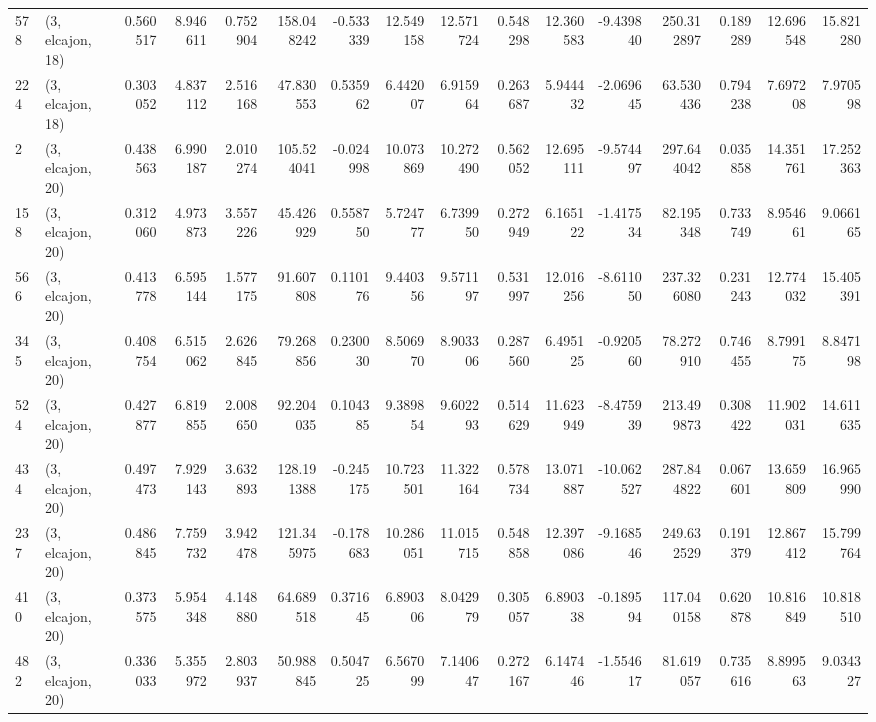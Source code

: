\begin{tabular}{llrrrrrrrrrrrrrr}
578 &  (3, elcajon, 18) &   0.560517 &   8.946611 &   0.752904 &   158.048242 &  -0.533339 &  12.549158 &  12.571724 &  0.548298 &  12.360583 &  -9.439840 &   250.312897 &  0.189289 &  12.696548 &  15.821280 \\
224 &  (3, elcajon, 18) &   0.303052 &   4.837112 &   2.516168 &    47.830553 &   0.535962 &   6.442007 &   6.915964 &  0.263687 &   5.944432 &  -2.069645 &    63.530436 &  0.794238 &   7.697208 &   7.970598 \\
2   &  (3, elcajon, 20) &   0.438563 &   6.990187 &   2.010274 &   105.524041 &  -0.024998 &  10.073869 &  10.272490 &  0.562052 &  12.695111 &  -9.574497 &   297.644042 &  0.035858 &  14.351761 &  17.252363 \\
158 &  (3, elcajon, 20) &   0.312060 &   4.973873 &   3.557226 &    45.426929 &   0.558750 &   5.724777 &   6.739950 &  0.272949 &   6.165122 &  -1.417534 &    82.195348 &  0.733749 &   8.954661 &   9.066165 \\
566 &  (3, elcajon, 20) &   0.413778 &   6.595144 &   1.577175 &    91.607808 &   0.110176 &   9.440356 &   9.571197 &  0.531997 &  12.016256 &  -8.611050 &   237.326080 &  0.231243 &  12.774032 &  15.405391 \\
345 &  (3, elcajon, 20) &   0.408754 &   6.515062 &   2.626845 &    79.268856 &   0.230030 &   8.506970 &   8.903306 &  0.287560 &   6.495125 &  -0.920560 &    78.272910 &  0.746455 &   8.799175 &   8.847198 \\
524 &  (3, elcajon, 20) &   0.427877 &   6.819855 &   2.008650 &    92.204035 &   0.104385 &   9.389854 &   9.602293 &  0.514629 &  11.623949 &  -8.475939 &   213.499873 &  0.308422 &  11.902031 &  14.611635 \\
434 &  (3, elcajon, 20) &   0.497473 &   7.929143 &   3.632893 &   128.191388 &  -0.245175 &  10.723501 &  11.322164 &  0.578734 &  13.071887 & -10.062527 &   287.844822 &  0.067601 &  13.659809 &  16.965990 \\
237 &  (3, elcajon, 20) &   0.486845 &   7.759732 &   3.942478 &   121.345975 &  -0.178683 &  10.286051 &  11.015715 &  0.548858 &  12.397086 &  -9.168546 &   249.632529 &  0.191379 &  12.867412 &  15.799764 \\
410 &  (3, elcajon, 20) &   0.373575 &   5.954348 &   4.148880 &    64.689518 &   0.371645 &   6.890306 &   8.042979 &  0.305057 &   6.890338 &  -0.189594 &   117.040158 &  0.620878 &  10.816849 &  10.818510 \\
482 &  (3, elcajon, 20) &   0.336033 &   5.355972 &   2.803937 &    50.988845 &   0.504725 &   6.567099 &   7.140647 &  0.272167 &   6.147446 &  -1.554617 &    81.619057 &  0.735616 &   8.899563 &   9.034327 \\

\end{tabular}
